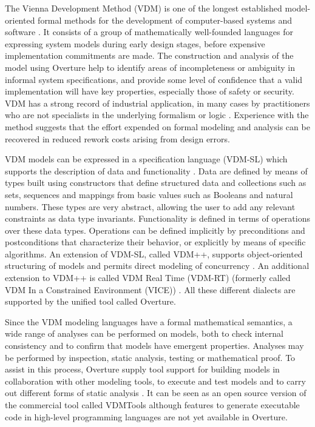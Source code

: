 \documentclass{overturerepchap}
\begin{document}
The Vienna Development Method (VDM) is one of the longest established
model-oriented formal methods for the development of computer-based
systems and software
\cite{Bjorner&78,Jones90a,Fitzgerald&08c}. It consists of a
group of mathematically well-founded languages for expressing system
models during early design stages, before expensive implementation
commitments are made. The construction and analysis of the model using
Overture help to identify areas of incompleteness or ambiguity in
informal system specifications, and provide some level of confidence
that a valid implementation will have key properties, especially those
of safety or security. VDM has a strong record of industrial
application, in many cases by practitioners who are not specialists in
the underlying formalism or logic
\cite{Larsen&95b,Clement&99,Kurita&09}. Experience with the method
suggests that the effort expended on formal modeling and analysis can
be recovered in reduced rework costs arising from design errors.

VDM models can be expressed in a specification language (VDM-SL) which
supports the description of data and functionality
\cite{ISOVDM96a,Fitzgerald&98b,Fitzgerald&09}. Data are defined by
means of types built using constructors that define structured data
and collections such as sets, sequences and mappings from basic values
such as Booleans and natural numbers. These types are very abstract, allowing
the user to add any relevant constraints as data type
invariants. Functionality is defined in terms of operations over these
data types. Operations can be defined implicitly by preconditions and
postconditions that characterize their behavior, or explicitly by
means of specific algorithms. An extension of VDM-SL, called VDM++,
supports object-oriented structuring of models and permits direct
modeling of concurrency \cite{Fitzgerald&05}. An additional extension
to VDM++ is called VDM Real Time (VDM-RT) (formerly called VDM In a
Constrained Environment (VICE)) \cite{Mukherjee&00,Verhoef&06b}. All
these different dialects are supported by the unified tool called Overture.

Since the VDM modeling languages have a formal mathematical semantics,
a wide range of analyses can be performed on models, both to check
internal consistency and to confirm that models have emergent
properties. Analyses may be performed by inspection, static analysis,
testing or mathematical proof. To assist in this process, Overture
supply tool support for building models in collaboration with other
modeling tools, to execute and test models and to carry out different
forms of static analysis \cite{Larsen&10a}. It can be seen as an open
source version of the commercial tool called VDMTools
\cite{Elmstrom&94,Larsen01,Fitzgerald&08a} although features to
generate executable code in high-level programming languages are
not yet available in Overture.
\end{document}
